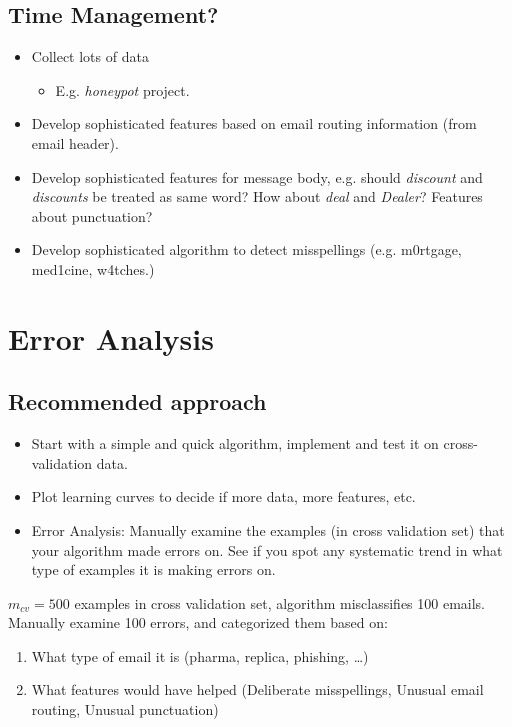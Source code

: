 \subsection{Time Management?}
\begin{itemize}
	\item Collect lots of data \begin{itemize}
		      \item E.g. \emph{honeypot} project.
	      \end{itemize}
	\item Develop sophisticated features based on email routing information (from email header).
	\item Develop sophisticated features for message body, e.g. should \emph{discount} and
	      \emph{discounts} be treated as same word? How about \emph{deal} and \emph{Dealer}?
	      Features about punctuation?
	\item Develop sophisticated algorithm to detect misspellings (e.g. m0rtgage, med1cine,
	      w4tches.)
\end{itemize}

\section{Error Analysis}
\subsection{Recommended approach}
\begin{itemize}
	\item Start with a simple and quick algorithm, implement and test it on cross-validation
	      data.
	\item Plot learning curves to decide if more data, more features, etc.
	\item Error Analysis: Manually examine the examples (in cross validation set) that
	      your algorithm made errors on. See if you spot any systematic trend in what type
	      of examples it is making errors on.
\end{itemize}

$m_{cv} = 500$ examples in cross validation set, algorithm misclassifies 100 emails.
Manually examine 100 errors, and categorized them based on:
\begin{enumerate}
	\item What type of email it is (pharma, replica, phishing, \dots)
	\item What features would have helped (Deliberate misspellings,
	      Unusual email routing, Unusual punctuation)
\end{enumerate}

